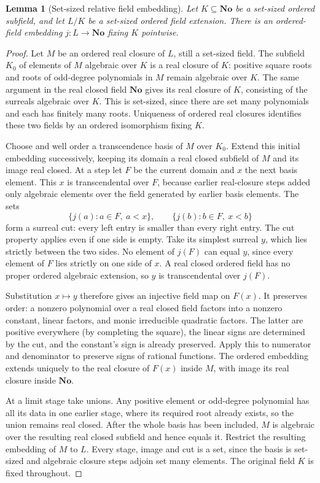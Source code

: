 \documentclass[11pt,a4paper]{article}
\numberwithin{equation}{section}
\newtheorem{lemma}[theorem]{Lemma}
\theoremstyle{definition}
\theoremstyle{remark}
\newcommand{\No}{\mathbf{No}}
\begin{document}
\begin{lemma}[Set-sized relative field embedding]\label{fsp:lem:embedding}
Let $K\subseteq\No$ be a set-sized ordered subfield, and let $L/K$ be
a set-sized ordered field extension. There is an ordered-field embedding
$j:L\to\No$ fixing $K$ pointwise.
\end{lemma}
\begin{proof}
Let $M$ be an ordered real closure of $L$, still a set-sized field.
The subfield $K_0$ of elements of $M$ algebraic over $K$ is a real
closure of $K$: positive square roots and roots of odd-degree polynomials
in $M$ remain algebraic over $K$. The same argument in the real closed
field $\No$ gives its real closure of $K$, consisting of the surreals
algebraic over $K$. This is set-sized, since there are set many polynomials
and each has finitely many roots. Uniqueness of ordered real closures
identifies these two fields by an ordered isomorphism fixing $K$.

Choose and well order a transcendence basis of $M$ over $K_0$. Extend
this initial embedding successively, keeping its domain a real closed
subfield of $M$ and its image real closed. At a step let $F$ be the
current domain and $x$ the next basis element. This $x$ is transcendental
over $F$, because earlier real-closure steps added only algebraic elements
over the field generated by earlier basis elements. The sets
\begin{equation}
 \{j(a):a\in F,\ a<x\},\qquad
 \{j(b):b\in F,\ x<b\}
\end{equation}
form a surreal cut: every left entry is smaller than every right entry.
The cut property applies even if one side is empty. Take its simplest
surreal $y$, which lies strictly between the two sides. No element of $j(F)$ can equal $y$, since
every element of $F$ lies strictly on one side of $x$. A real closed
ordered field has no proper ordered algebraic extension, so $y$ is
transcendental over $j(F)$.

Substitution $x\mapsto y$ therefore gives an injective field map on
$F(x)$. It preserves order: a nonzero polynomial over a real closed
field factors into a nonzero constant, linear factors, and monic
irreducible quadratic factors. The latter are positive everywhere
(by completing the square), the linear signs are determined by the cut,
and the constant's sign is already preserved. Apply this to numerator
and denominator to preserve signs of rational functions. The ordered
embedding extends uniquely to the real closure of $F(x)$ inside $M$,
with image its real closure inside $\No$.

At a limit stage take unions. Any positive element or odd-degree
polynomial has all its data in one earlier stage, where its required
root already exists, so the union remains real closed. After the whole
basis has been included, $M$ is algebraic over the resulting real closed
subfield and hence equals it. Restrict the resulting embedding of $M$
to $L$. Every stage, image and cut is a set, since the basis is set-sized
and algebraic closure steps adjoin set many elements. The original
field $K$ is fixed throughout.
\end{proof}
\end{document}
